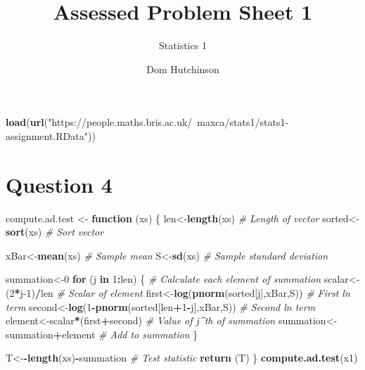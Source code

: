 \documentclass[]{article}
\title{Assessed Problem Sheet 1}
\subtitle{Statistics 1}
\author{Dom Hutchinson}
\date{}
\newenvironment{Shaded}{\begin{snugshade}}{\end{snugshade}}
\newcommand{\CommentTok}[1]{\textcolor[rgb]{0.56,0.35,0.01}{\textit{#1}}}
\newcommand{\ControlFlowTok}[1]{\textcolor[rgb]{0.13,0.29,0.53}{\textbf{#1}}}
\newcommand{\DecValTok}[1]{\textcolor[rgb]{0.00,0.00,0.81}{#1}}
\newcommand{\KeywordTok}[1]{\textcolor[rgb]{0.13,0.29,0.53}{\textbf{#1}}}
\newcommand{\NormalTok}[1]{#1}
\newcommand{\OperatorTok}[1]{\textcolor[rgb]{0.81,0.36,0.00}{\textbf{#1}}}
\newcommand{\StringTok}[1]{\textcolor[rgb]{0.31,0.60,0.02}{#1}}
\begin{document}
\maketitle

\begin{Shaded}
\begin{Highlighting}[]
\KeywordTok{load}\NormalTok{(}\KeywordTok{url}\NormalTok{(}\StringTok{"https://people.maths.bris.ac.uk/~maxca/stats1/stats1-assignment.RData"}\NormalTok{))}
\end{Highlighting}
\end{Shaded}

\hypertarget{question-4}{%
\section{Question 4}\label{question-4}}

\begin{Shaded}
\begin{Highlighting}[]
\NormalTok{compute.ad.test <-}\StringTok{ }\ControlFlowTok{function}\NormalTok{ (xs) \{}
\NormalTok{  len<-}\KeywordTok{length}\NormalTok{(xs)  }\CommentTok{# Length of vector}
\NormalTok{  sorted<-}\KeywordTok{sort}\NormalTok{(xs) }\CommentTok{# Sort vector}
  
\NormalTok{  xBar<-}\KeywordTok{mean}\NormalTok{(xs)   }\CommentTok{# Sample mean}
\NormalTok{  S<-}\KeywordTok{sd}\NormalTok{(xs)        }\CommentTok{# Sample standard deviation}
  
\NormalTok{  summation<-}\DecValTok{0}
  \ControlFlowTok{for}\NormalTok{ (j }\ControlFlowTok{in} \DecValTok{1}\OperatorTok{:}\NormalTok{len) \{                             }\CommentTok{# Calculate each element of summation}
\NormalTok{    scalar<-(}\DecValTok{2}\OperatorTok{*}\NormalTok{j}\DecValTok{-1}\NormalTok{)}\OperatorTok{/}\NormalTok{len                          }\CommentTok{# Scalar of element}
\NormalTok{    first<-}\KeywordTok{log}\NormalTok{(}\KeywordTok{pnorm}\NormalTok{(sorted[j],xBar,S))          }\CommentTok{# First ln term}
\NormalTok{    second<-}\KeywordTok{log}\NormalTok{(}\DecValTok{1}\OperatorTok{-}\KeywordTok{pnorm}\NormalTok{(sorted[len}\OperatorTok{+}\DecValTok{1}\OperatorTok{-}\NormalTok{j],xBar,S)) }\CommentTok{# Second ln term}
\NormalTok{    element<-scalar}\OperatorTok{*}\NormalTok{(first}\OperatorTok{+}\NormalTok{second)               }\CommentTok{# Value of j^th of summation}
\NormalTok{    summation<-summation}\OperatorTok{+}\NormalTok{element                 }\CommentTok{# Add to summation}
\NormalTok{  \}}
  
\NormalTok{  T<-}\OperatorTok{-}\KeywordTok{length}\NormalTok{(xs)}\OperatorTok{-}\NormalTok{summation }\CommentTok{# Test statistic }
  \KeywordTok{return}\NormalTok{ (T)}
\NormalTok{\}}
\KeywordTok{compute.ad.test}\NormalTok{(x1)}
\end{Highlighting}
\end{Shaded}
\end{document}
